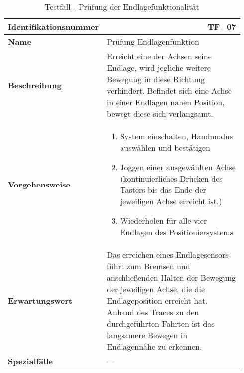 \documentclass[../../../Bachelorarbeit.tex]{subfiles}
\begin{document}
\begin{table}[H]
    \centering
    \begin{tabular}{ p{0.34\linewidth}  p{0.6\linewidth} }
        \hline
        \textbf{Identifikationsnummer}  & \multicolumn{1}{r}{TF\_07} \\ \hline
        \textbf{Name}                   & Prüfung Endlagenfunktion \\
        \textbf{Beschreibung}           & Erreicht eine der Achsen seine Endlage, wird jegliche weitere Bewegung in diese Richtung verhindert. Befindet sich eine Achse in einer Endlagen nahen Position, bewegt diese sich verlangsamt. \\
        \textbf{Vorgehensweise}         &   {\begin{enumerate}[noitemsep,topsep=0pt,parsep=0pt,partopsep=0pt,leftmargin=*]
                                                \item System einschalten, Handmodus auswählen und bestätigen
                                                \item Joggen einer ausgewählten Achse (kontinuierliches Drücken des Tasters bis das Ende der jeweiligen Achse erreicht ist.)
                                                \item Wiederholen für alle vier Endlagen des Positioniersystems
                                            \end{enumerate}} \\
        \textbf{Erwartungswert}         & Das erreichen eines Endlagesensors führt zum Bremsen und anschließenden Halten der Bewegung der jeweiligen Achse, die die Endlageposition erreicht hat. Anhand des Traces zu den durchgeführten Fahrten ist das langsamere Bewegen in Endlagennähe zu erkennen. \\
        \textbf{Spezialfälle}           & --- \\ \hline
    \end{tabular}
    \caption[\acs{tf} - Endlagenfunktion]{Testfall - Prüfung der Endlagefunktionalität}
    \label{tab:my-table66}
\end{table}
\end{document}

